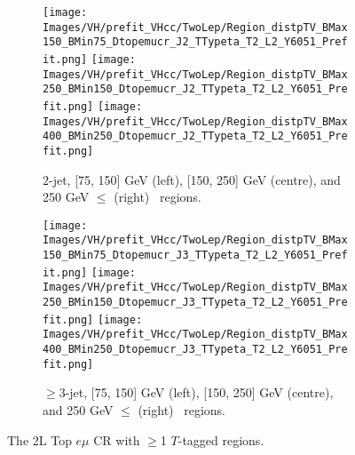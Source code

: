 \begin{figure}[h!]
    \centering
    \begin{subfigure}[b]{\textwidth}
        \centering
        \texttt{[image: Images/VH/prefit\_VHcc/TwoLep/Region\_distpTV\_BMax150\_BMin75\_Dtopemucr\_J2\_TTypeta\_T2\_L2\_Y6051\_Prefit.png]}
        \texttt{[image: Images/VH/prefit\_VHcc/TwoLep/Region\_distpTV\_BMax250\_BMin150\_Dtopemucr\_J2\_TTypeta\_T2\_L2\_Y6051\_Prefit.png]}
        \texttt{[image: Images/VH/prefit\_VHcc/TwoLep/Region\_distpTV\_BMax400\_BMin250\_Dtopemucr\_J2\_TTypeta\_T2\_L2\_Y6051\_Prefit.png]}
        \caption{2-jet, [75, 150] GeV (left), [150, 250] GeV (centre), and 250  GeV $\leq$ (right) \ptv\ regions.}
        \label{fig:plots_VHcc_2L_topCRemu_2J}
    \end{subfigure}
    \begin{subfigure}[b]{\textwidth}
        \centering
        \texttt{[image: Images/VH/prefit\_VHcc/TwoLep/Region\_distpTV\_BMax150\_BMin75\_Dtopemucr\_J3\_TTypeta\_T2\_L2\_Y6051\_Prefit.png]}
        \texttt{[image: Images/VH/prefit\_VHcc/TwoLep/Region\_distpTV\_BMax250\_BMin150\_Dtopemucr\_J3\_TTypeta\_T2\_L2\_Y6051\_Prefit.png]}
        \texttt{[image: Images/VH/prefit\_VHcc/TwoLep/Region\_distpTV\_BMax400\_BMin250\_Dtopemucr\_J3\_TTypeta\_T2\_L2\_Y6051\_Prefit.png]}
        \caption{$\geq$3-jet, [75, 150] GeV (left), [150, 250] GeV (centre), and 250  GeV $\leq$ (right) \ptv\ regions.}
        \label{fig:plots_VHcc_2L_topCRemu_3J}
    \end{subfigure}
    \caption{The 2L Top $e\mu$ CR with $\geq$1 $T$-tagged regions.}
    \label{fig:plots_VHcc_2L_topCRemu}
\end{figure}

